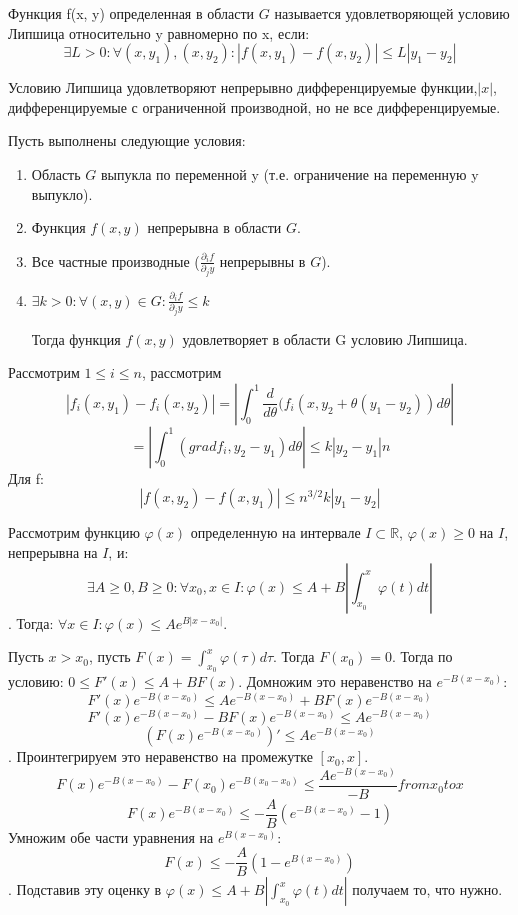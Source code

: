 \documentclass[document.tex]{subfiles}
\begin{document}
\begin{Definition}
Функция f(x, y) определенная в области $G$ называется удовлетворяющей условию Липшица относительно y равномерно по x, если:
$$\exists L > 0 : \forall (x, y_1), (x, y_2): |f(x, y_1) - f(x, y_2)| \leq L |y_1 - y_2|$$
\end{Definition}

\begin{Remark}
Условию Липшица удовлетворяют непрерывно дифференцируемые функции,$|x|$, дифференцируемые с ограниченной производной, но не все дифференцируемые.
\end{Remark}
\begin{Lemma}
Пусть выполнены следующие условия:
\begin{enumerate}
\item Область $G$ выпукла по переменной y (т.е. ограничение на переменную y выпукло).
\item Функция $f(x, y)$ непрерывна в области $G$.
\item Все частные производные ($\frac{\partial_i f}{\partial_j y}$ непрерывны в $G$).
\item $\exists k > 0: \forall (x, y) \in G : \frac{\partial_i f}{\partial_j y} \leq k$

Тогда функция $f(x, y)$ удовлетворяет в области G условию Липшица.
\end{enumerate}
\end{Lemma}
\begin{Proof}
Рассмотрим $1 \leq i \leq n$, рассмотрим 
$$|f_i(x, y_1) - f_i(x, y_2)| = |\int_0^1 \frac{d}{d \theta}(f_i(x, y_2 + \theta(y_1 - y_2))d \theta|$$
$$ = |\int_0^1 (grad f_i, y_2 - y_1)d\theta| \leq k |y_2 - y_1| n$$
Для f:
$$|f(x, y_2) - f(x, y_1)| \leq n^{3/2} k |y_1 - y_2|$$
\end{Proof}

\begin{Lemma}[Гронуолла]
Рассмотрим функцию $\varphi(x)$ определенную на интервале $I \subset \mathbb{R}$, $\varphi(x) \geq 0$ на $I$, непрерывна на $I$, и:
$$\exists A \geq 0, B \geq 0 : \forall x_0, x \in I: \varphi(x) \leq A+B|\int_{x_0}^x \varphi(t) dt|$$.
Тогда: $\forall x \in I : \varphi(x) \leq Ae^{B|x - x_0|}$.
\end{Lemma}
\begin{Proof}
Пусть $x > x_0$, пусть $F(x) = \int_{x_0}^x \varphi(\tau) d\tau$. Тогда $F(x_0) = 0$. Тогда по условию: $0 \leq F'(x) \leq A + BF(x)$. Домножим это неравенство на $e^{-B(x - x_0)}$:
$$F'(x)e^{-B(x - x_0)} \leq Ae^{-B(x - x_0)} + BF(x)e^{-B(x - x_0)}$$
$$F'(x)e^{-B(x-x_0)} - BF(x)e^{-B(x - x_0)} \leq Ae^{-B(x - x_0)}$$
$$(F(x)e^{-B(x-x_0)})' \leq Ae^{-B(x - x_0)}$$.
Проинтегрируем это неравенство на промежутке $[x_0, x]$.
$$F(x)e^{-B(x-x_0)} - F(x_0)e^{-B(x_0-x_0)} \leq \frac{Ae^{-B(x - x_0)}}{-B} from x_0 to x$$
$$F(x)e^{-B(x-x_0)} \leq -\frac{A}{B}(e^{-B(x - x_0)} - 1)$$
Умножим обе части уравнения на $e^{B(x - x_0)}$:
$$F(x) \leq -\frac{A}{B}(1 - e^{B(x - x_0)})$$.
Подставив эту оценку в $\varphi(x) \leq A+B|\int_{x_0}^x \varphi(t) dt|$ получаем то, что нужно.
\end{Proof}
\end{document}
